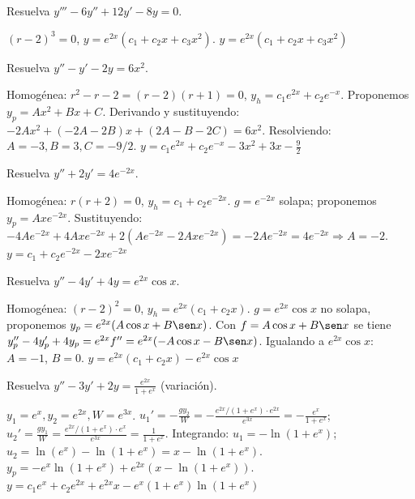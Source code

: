 \begin{prob}
Resuelva $y''' - 6y'' + 12y' - 8y = 0$.
\begin{myproof}
$(r-2)^3=0$, $y=e^{2x}(c_1+c_2 x+c_3 x^2)$. $\boxed{y=e^{2x}(c_1+c_2 x+c_3 x^2)}$
\end{myproof}
\end{prob}

\begin{prob}
Resuelva $y'' - y' - 2y = 6x^2$.
\begin{myproof}
Homogénea: $r^2-r-2=(r-2)(r+1)=0$, $y_h=c_1 e^{2x}+c_2 e^{-x}$. Proponemos $y_p=Ax^2+Bx+C$. Derivando y sustituyendo: $-2A x^2 + (-2A-2B)x + (2A - B - 2C) = 6x^2$. Resolviendo: $A=-3, B=3, C=-9/2$. $\boxed{y=c_1 e^{2x}+c_2 e^{-x}-3x^2+3x-\frac{9}{2}}$
\end{myproof}
\end{prob}

\begin{prob}
Resuelva $y'' + 2y' = 4e^{-2x}$.
\begin{myproof}
Homogénea: $r(r+2)=0$, $y_h=c_1+c_2 e^{-2x}$. $g=e^{-2x}$ solapa; proponemos $y_p=A x e^{-2x}$. Sustituyendo: $-4A e^{-2x}+4A x e^{-2x}+2(A e^{-2x}-2A x e^{-2x})= -2A e^{-2x}=4e^{-2x} \Rightarrow A=-2$. $\boxed{y=c_1+c_2 e^{-2x}-2x e^{-2x}}$
\end{myproof}
\end{prob}

\begin{prob}
Resuelva $y'' - 4y' + 4y = e^{2x}\cos x$.
\begin{myproof}
Homogénea: $(r-2)^2=0$, $y_h=e^{2x}(c_1+c_2 x)$. $g=e^{2x}\cos x$ no solapa, proponemos $y_p=e^{2x}(A\cos x+B\sen x)$. Con $f=A\cos x+B\sen x$ se tiene $y_p''-4y_p'+4y_p=e^{2x}f''=e^{2x}(-A\cos x-B\sen x)$. Igualando a $e^{2x}\cos x$: $A=-1$, $B=0$. $\boxed{y=e^{2x}(c_1+c_2 x)-e^{2x}\cos x}$
\end{myproof}
\end{prob}

\begin{prob}
Resuelva $y'' - 3y' + 2y = \frac{e^{2x}}{1+e^x}$ (variación).
\begin{myproof}
$y_1=e^x, y_2=e^{2x}, W=e^{3x}$. $u_1'=-\frac{g y_2}{W}=-\frac{e^{2x}/(1+e^x)\cdot e^{2x}}{e^{3x}}=-\frac{e^{x}}{1+e^x}$; $u_2'=\frac{g y_1}{W}=\frac{e^{2x}/(1+e^x)\cdot e^x}{e^{3x}}=\frac{1}{1+e^x}$. Integrando: $u_1=-\ln(1+e^x)$; $u_2=\ln(e^x)-\ln(1+e^x)=x-\ln(1+e^x)$. $y_p=-e^x\ln(1+e^x)+e^{2x}(x-\ln(1+e^x))$. $\boxed{y=c_1e^x+c_2e^{2x}+e^{2x}x-e^x(1+e^x)\ln(1+e^x)}$
\end{myproof}
\end{prob}

